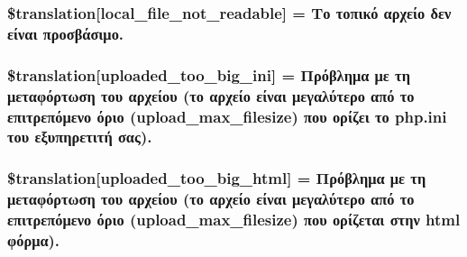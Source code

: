 \subsubsection[{\$translation}]{\setlength{\rightskip}{0pt plus 5cm}\$translation\mbox{[}\textquotesingle{}local\+\_\+file\+\_\+not\+\_\+readable\textquotesingle{}\mbox{]} = \textquotesingle{}Το τοπικό αρχείο δεν είναι προσβάσιμο.\textquotesingle{}}\label{class_8upload_8el___g_r_8php_a60104befef9b241f3a7a6a755618a4b3}
\hypertarget{class_8upload_8el___g_r_8php_a6a08dcd0d3651fdd098568f6b2f0a42c}{}
\subsubsection[{\$translation}]{\setlength{\rightskip}{0pt plus 5cm}\$translation\mbox{[}\textquotesingle{}uploaded\+\_\+too\+\_\+big\+\_\+ini\textquotesingle{}\mbox{]} = \textquotesingle{}Πρόβλημα με τη μεταφόρτωση του αρχείου (το αρχείο είναι μεγαλύτερο από το επιτρεπόμενο όριο (upload\+\_\+max\+\_\+filesize) που ορίζει το php.\+ini του εξυπηρετιτή σας).\textquotesingle{}}\label{class_8upload_8el___g_r_8php_a6a08dcd0d3651fdd098568f6b2f0a42c}
\hypertarget{class_8upload_8el___g_r_8php_a623d5b8b92169f57d7e43458aa911cbb}{}
\subsubsection[{\$translation}]{\setlength{\rightskip}{0pt plus 5cm}\$translation\mbox{[}\textquotesingle{}uploaded\+\_\+too\+\_\+big\+\_\+html\textquotesingle{}\mbox{]} = \textquotesingle{}Πρόβλημα με τη μεταφόρτωση του αρχείου (το αρχείο είναι μεγαλύτερο από το επιτρεπόμενο όριο (upload\+\_\+max\+\_\+filesize) που ορίζεται στην html φόρμα).\textquotesingle{}}\label{class_8upload_8el___g_r_8php_a623d5b8b92169f57d7e43458aa911cbb}
\hypertarget{class_8upload_8el___g_r_8php_a967c17da21b0a2d3bd65cca3a9ca0ea8}{}
